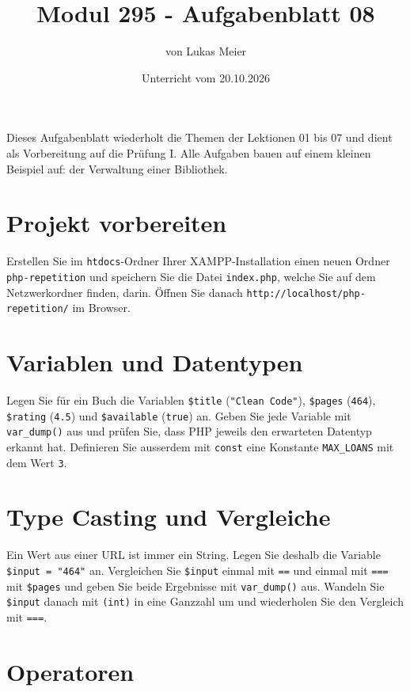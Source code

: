 \documentclass[a4paper,12pt]{article}
\title{Modul 295 - Aufgabenblatt 08}
\author{von Lukas Meier}
\date{Unterricht vom 20.10.2026}
\begin{document}
\maketitle

Dieses Aufgabenblatt wiederholt die Themen der Lektionen 01 bis 07 und dient als Vorbereitung auf die Prüfung I. Alle Aufgaben bauen auf einem kleinen Beispiel auf: der Verwaltung einer Bibliothek.

\section{Projekt vorbereiten}

Erstellen Sie im \texttt{htdocs}-Ordner Ihrer XAMPP-Installation einen neuen Ordner \texttt{php-repetition} und speichern Sie die Datei \texttt{index.php}, welche Sie auf dem Netzwerkordner finden, darin. Öffnen Sie danach \texttt{http://localhost/php-repetition/} im Browser.

\section{Variablen und Datentypen}

Legen Sie für ein Buch die Variablen \texttt{\$title} (\texttt{"{}Clean Code"{}}), \texttt{\$pages} (\texttt{464}), \texttt{\$rating} (\texttt{4.5}) und \texttt{\$available} (\texttt{true}) an. Geben Sie jede Variable mit \texttt{var\_dump()} aus und prüfen Sie, dass PHP jeweils den erwarteten Datentyp erkannt hat. Definieren Sie ausserdem mit \texttt{const} eine Konstante \texttt{MAX\_LOANS} mit dem Wert \texttt{3}.

\section{Type Casting und Vergleiche}

Ein Wert aus einer URL ist immer ein String. Legen Sie deshalb die Variable \texttt{\$input = "{}464"{}} an. Vergleichen Sie \texttt{\$input} einmal mit \texttt{==} und einmal mit \texttt{===} mit \texttt{\$pages} und geben Sie beide Ergebnisse mit \texttt{var\_dump()} aus. Wandeln Sie \texttt{\$input} danach mit \texttt{(int)} in eine Ganzzahl um und wiederholen Sie den Vergleich mit \texttt{===}.

\section{Operatoren}
\end{document}
